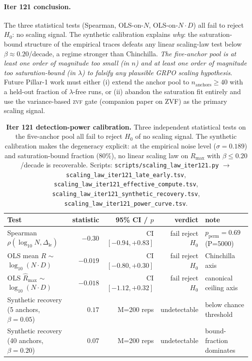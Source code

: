 \paragraph{Iter 121 conclusion.}
\label{par:scaling-iter121-conclusion}
The three statistical tests (Spearman, OLS-on-$N$, OLS-on-$N \cdot D$)
all fail to reject $H_0$: no scaling signal.  The synthetic
calibration explains \emph{why}: the saturation-bound structure of
the empirical traces defeats any linear scaling-law test below
$\beta \approx 0.20$/decade, a regime stronger than Chinchilla.
\emph{The five-anchor pool is at least one order of magnitude too
small (in $n$) and at least one order of magnitude too
saturation-bound (in $\lambda$) to falsify any plausible GRPO
scaling hypothesis}.  Future Pillar-1 work must either (i) extend
the anchor pool to $n_{\text{anchors}} \ge 40$ with a held-out
fraction of $\lambda$-free runs, or (ii) abandon the saturation
fit entirely and use the variance-based \textsc{zvf} gate
(companion paper on ZVF) as the primary scaling signal.

\begin{table}[t]
  \centering
  \small
  \begin{tabular}{lrrrl}
    \toprule
    Test & statistic & 95\% CI / $p$ & verdict & note \\
    \midrule
    Spearman $\rho(\log_{10}N, \Delta_{\text{le}})$ &
      $-0.30$ & CI $[-0.94, +0.83]$ &
      fail reject $H_0$ & $p_{\text{perm}} = 0.69$ (P=5000) \\
    OLS mean $R$ $\sim$ $\log_{10}(N \cdot D)$ &
      $-0.019$ & CI $[-0.80, +0.30]$ &
      fail reject $H_0$ & Chinchilla axis \\
    OLS $\hat R_{\max}$ $\sim$ $\log_{10}(N \cdot D)$ &
      $-0.018$ & CI $[-1.12, +0.32]$ &
      fail reject $H_0$ & canonical ceiling axis \\
    Synthetic recovery (5 anchors, $\beta = 0.05$) &
      $0.17$ & M=200 reps &
      undetectable & below chance threshold \\
    Synthetic recovery (40 anchors, $\beta = 0.20$) &
      $0.07$ & M=200 reps &
      undetectable & bound-fraction dominates \\
    \bottomrule
  \end{tabular}
  \caption{\textbf{Iter 121 detection-power calibration.}
    Three independent statistical tests on the five-anchor pool
    all fail to reject $H_0$ of no scaling signal.  The synthetic
    calibration makes the degeneracy explicit: at the empirical
    noise level ($\sigma = 0.189$) and saturation-bound fraction
    ($80\%$), no linear scaling law on $R_{\max}$ with
    $\beta \le 0.20$/decade is recoverable.  Scripts:
    \texttt{scripts/scaling\_law\_iter121.py} $\to$
    \texttt{scaling\_law\_iter121\_late\_early.tsv},
    \texttt{scaling\_law\_iter121\_effective\_compute.tsv},
    \texttt{scaling\_law\_iter121\_synthetic\_recovery.tsv},
    \texttt{scaling\_law\_iter121\_power\_curve.tsv}.}
  \label{tab:scaling-iter121}
\end{table}

